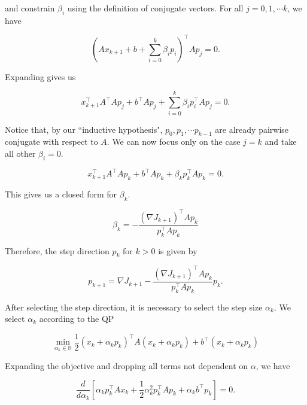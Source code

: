 \documentclass[12pt,titlepage]{report}
\begin{document}
	and constrain \( \beta_i \) using the definition of conjugate vectors.  For all \( j = 0, 1, \cdots k \), we have
	
	\begin{equation}
		(A x_{k+1} + b + \sum_{i=0}^k \beta_i p_i)^\top A p_j = 0.
	\end{equation}
	
	Expanding gives us
	
	\begin{equation}
		x_{k+1}^\top A^\top A p_j + b^\top A p_j + \sum_{i=0}^k \beta_i p_i^\top A p_j = 0 .
	\end{equation}
	
	Notice that, by our ``inductive hypothesis", \( p_0, p_1, \cdots p_{k-1} \) are already pairwise conjugate with respect to \( A \).  We can now focus only on the case \( j = k \) and take all other \( \beta_i = 0 \).
	
	\begin{equation}
		x_{k+1}^\top A^\top A p_k + b^\top A p_k + \beta_k p_k^\top A p_k = 0 .
	\end{equation}
	
	This gives us a closed form for \( \beta_k \).
	
	\begin{equation}
		\beta_k = -\frac{(\nabla J_{k+1})^\top A p_k}{p_k^\top A p_k}
	\end{equation}
	
	Therefore, the step direction \( p_k \) for \( k > 0 \) is given by
	
	\begin{equation}
		\boxed{p_{k+1} = \nabla J_{k+1} - \frac{(\nabla J_{k+1})^\top A p_k}{p_k^\top A p_k} p_k. }
	\end{equation}
	
	After selecting the step direction, it is necessary to select the step size \( \alpha_k \).  We select \( \alpha_k \) according to the QP
	
	\begin{equation}
		\min_{\alpha_k \in \mathbb{R}} \frac12 (x_k + \alpha_k p_k)^\top A (x_k + \alpha_k p_k) + b^\top (x_k + \alpha_k p_k)
	\end{equation}
	
	Expanding the objective and dropping all terms not dependent on \( \alpha \), we have
	
	\begin{equation}
		\frac{d}{d\alpha_k} \left[ \alpha_k p_k^\top A x_k + \frac12 \alpha_k^2 p_k^\top A p_k + \alpha_k b^\top p_k \right] = 0.
	\end{equation}
	
\end{document}
